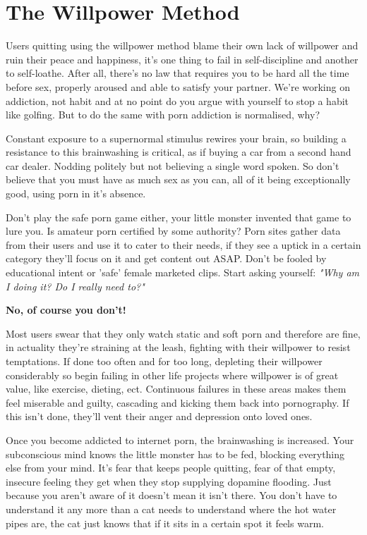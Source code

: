 \documentclass[easypeasy.tex]{subfiles}
\begin{document}
\section{The Willpower Method}
Users quitting using the willpower method blame their own lack of willpower and ruin their peace and happiness, it's one thing to fail in self-discipline and another to self-loathe. After all, there's no law that requires you to be hard all the time before sex, properly aroused and able to satisfy your partner. We're working on addiction, not habit and at no point do you argue with yourself to stop a habit like golfing. But to do the same with porn addiction is normalised, why?

Constant exposure to a supernormal stimulus rewires your brain, so building a resistance to this brainwashing is critical, as if buying a car from a second hand car dealer. Nodding politely but not believing a single word spoken. So don't believe that you must have as much sex as you can, all of it being exceptionally good, using porn in it's absence.

Don't play the safe porn game either, your little monster invented that game to lure you. Is amateur porn certified by some authority? Porn sites gather data from their users and use it to cater to their needs, if they see a uptick in a certain category they'll focus on it and get content out ASAP. Don't be fooled by educational intent or 'safe' female marketed clips. Start asking yourself: \textit{"Why am I doing it? Do I really need to?"}

\textbf{No, of course you don't!}

Most users swear that they only watch static and soft porn and therefore are fine, in actuality they're straining at the leash, fighting with their willpower to resist temptations. If done too often and for too long, depleting their willpower considerably so begin failing in other life projects where willpower is of great value, like exercise, dieting, ect. Continuous failures in these areas makes them feel miserable and guilty, cascading and kicking them back into pornography. If this isn't done, they'll vent their anger and depression onto loved ones.

Once you become addicted to internet porn, the brainwashing is increased. Your subconscious mind knows the little monster has to be fed, blocking everything else from your mind. It's fear that keeps people quitting, fear of that empty, insecure feeling they get when they stop supplying dopamine flooding. Just because you aren't aware of it doesn't mean it isn't there. You don't have to understand it any more than a cat needs to understand where the hot water pipes are, the cat just knows that if it sits in a certain spot it feels warm.
\end{document}

